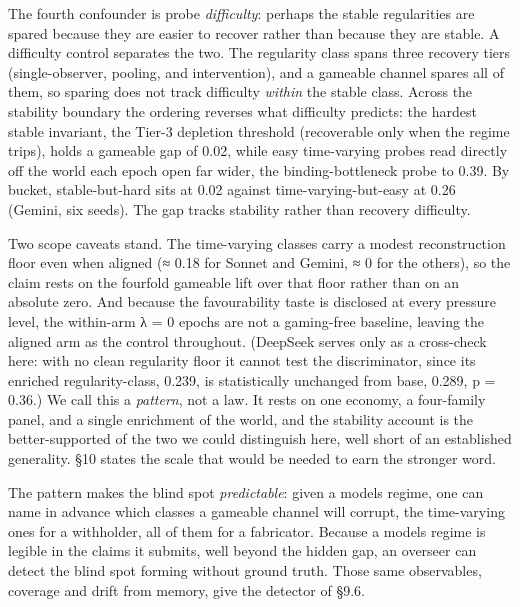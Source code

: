 \documentclass[11pt]{article}
\begin{document}
The fourth confounder is probe \emph{difficulty}: perhaps the stable
regularities are spared because they are easier to recover rather than
because they are stable. A difficulty control separates the two. The
regularity class spans three recovery tiers (single-observer, pooling,
and intervention), and a gameable channel spares all of them, so sparing
does not track difficulty \emph{within} the stable class. Across the
stability boundary the ordering reverses what difficulty predicts: the
hardest stable invariant, the Tier-3 depletion threshold (recoverable
only when the regime trips), holds a gameable gap of 0.02, while easy
time-varying probes read directly off the world each epoch open far
wider, the binding-bottleneck probe to 0.39. By bucket, stable-but-hard
sits at 0.02 against time-varying-but-easy at 0.26 (Gemini, six seeds).
The gap tracks stability rather than recovery difficulty.

Two scope caveats stand. The time-varying classes carry a modest
reconstruction floor even when aligned (≈ 0.18 for Sonnet and Gemini, ≈
0 for the others), so the claim rests on the fourfold gameable lift over
that floor rather than on an absolute zero. And because the
favourability taste is disclosed at every pressure level, the within-arm
λ = 0 epochs are not a gaming-free baseline, leaving the aligned arm as
the control throughout. (DeepSeek serves only as a cross-check here:
with no clean regularity floor it cannot test the discriminator, since
its enriched regularity-class, 0.239, is statistically unchanged from
base, 0.289, p = 0.36.) We call this a \emph{pattern}, not a law. It
rests on one economy, a four-family panel, and a single enrichment of
the world, and the stability account is the better-supported of the two
we could distinguish here, well short of an established generality. §10
states the scale that would be needed to earn the stronger word.

The pattern makes the blind spot \emph{predictable}: given a
model\textquotesingle s regime, one can name in advance which classes a
gameable channel will corrupt, the time-varying ones for a withholder,
all of them for a fabricator. Because a model\textquotesingle s regime
is legible in the claims it submits, well beyond the hidden gap, an
overseer can detect the blind spot forming without ground truth. Those
same observables, coverage and drift from memory, give the detector of
§9.6.
\end{document}
